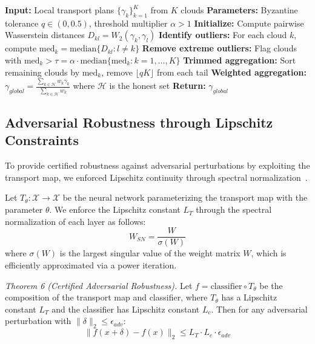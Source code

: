 \documentclass{ieeeaccess}
\theoremstyle{plain}
\theoremstyle{definition}
\theoremstyle{remark}
\begin{document}
\begin{algorithm}[t]
\caption{Byzantine-Robust Transport Plan Aggregation}
\label{alg:byzantine}
\begin{algorithmic}[1]
\STATE \textbf{Input:} Local transport plans $\{\gamma_k\}_{k=1}^K$ from $K$ clouds
\STATE \textbf{Parameters:} Byzantine tolerance $q \in (0, 0.5)$, threshold multiplier $\alpha > 1$
\STATE \textbf{Initialize:} Compute pairwise Wasserstein distances
        \STATE $D_{kl} = W_2(\gamma_k, \gamma_l)$ 
    \ENDFOR
\ENDFOR
\STATE \textbf{Identify outliers:} For each cloud $k$, compute
\STATE $\text{med}_k = \text{median}\{D_{kl} : l \neq k\}$
\STATE \textbf{Remove extreme outliers:} Flag clouds with
\STATE $\text{med}_k > \tau = \alpha \cdot \text{median}\{\text{med}_k : k = 1, \ldots, K\}$
\STATE \textbf{Trimmed aggregation:} Sort remaining clouds by $\text{med}_k$, remove $\lfloor qK \rfloor$ from each tail
\STATE \textbf{Weighted aggregation:}
\STATE $\gamma_{global} = \frac{\sum_{k \in \mathcal{H}} w_k \gamma_k}{\sum_{k \in \mathcal{H}} w_k}$ where $\mathcal{H}$ is the honest set
\STATE \textbf{Return:} $\gamma_{global}$
\end{algorithmic}
\end{algorithm}

\subsection{Adversarial Robustness through Lipschitz Constraints}

To provide certified robustness against adversarial perturbations by exploiting the transport map, we enforced Lipschitz continuity through spectral normalization~\cite{miyato2018}.

Let $T_\theta: \mathcal{X} \to \mathcal{X}$ be the neural network parameterizing the transport map with the parameter $\theta$. We enforce the Lipschitz constant $L_T$ through the spectral normalization of each layer as follows:
\begin{equation}
W_{SN} = \frac{W}{\sigma(W)}
\end{equation}
where $\sigma(W)$ is the largest singular value of the weight matrix $W$, which is efficiently approximated via a power iteration.

\textit{Theorem 6 (Certified Adversarial Robustness).} Let $f = \text{classifier} \circ T_\theta$ be the composition of the transport map and classifier, where $T_\theta$ has a Lipschitz constant $L_T$ and the classifier has Lipschitz constant $L_c$. Then for any adversarial perturbation with $\|\delta\|_2 \leq \epsilon_{adv}$:
\begin{equation}
\|f(x + \delta) - f(x)\|_2 \leq L_T \cdot L_c \cdot \epsilon_{adv}
\end{equation}
\end{document}
